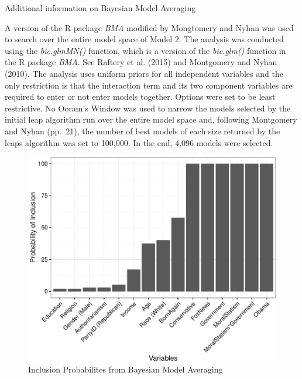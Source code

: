 \documentclass[12pt,]{article}
\begin{document}
\clearpage

Additional information on Bayesian Model Averaging

A version of the R package \emph{BMA} modified by
Mongtomery and Nyhan was used to search over the entire model space of
Model 2. The analysis was conducted using the \emph{bic.glmMN()} function, which is a version of the
\emph{bic.glm()} function in the R package \emph{BMA}. See Raftery et
  al. (2015) and Montgomery and Nyhan (2010). The analysis uses
uniform priors for all independent variables and the only restriction is
that the interaction term and its two component variables are required
to enter or not enter models together. Options were set to be least restrictive.
No Occam's Window was used to narrow the models selected by the initial leap algorithm run over the entire model space and, following Montgomery and Nyhan (pp.~21), the number of best models of each size returned by the leaps algorithm was set to 100,000. In the end, 4,096 models were selected.

\begin{figure}[htbp]
\centering
\includegraphics{figures/bma2-1.pdf}
\caption{Inclusion Probabilites from Bayesian Model Averaging}
\end{figure}

\clearpage
\end{document}
